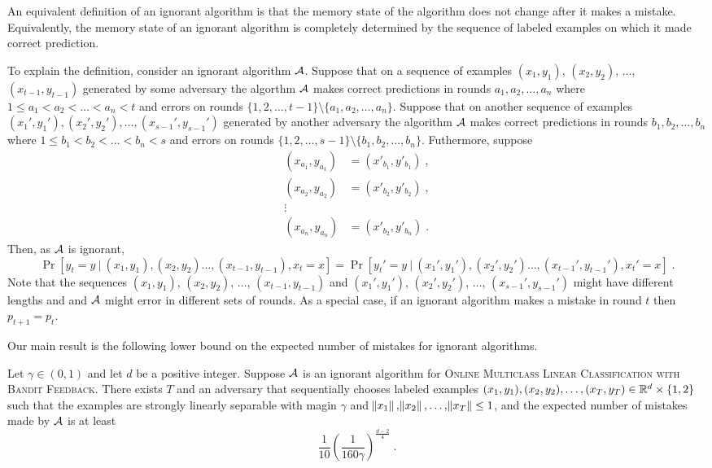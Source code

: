 An equivalent definition of an ignorant algorithm is that the memory state of
the algorithm does not change after it makes a mistake. Equivalently,
the memory state of an ignorant algorithm is completely determined
by the sequence of labeled examples on which it made correct prediction.

To explain the definition, consider an ignorant algorithm $\mathcal{A}$. Suppose that
on a sequence of examples $(x_1, y_1)$, $(x_2, y_2)$, $\dots$, $(x_{t-1}, y_{t-1})$
generated by some adversary the algorthm $\mathcal{A}$ makes correct predictions in
rounds $a_1, a_2, \dots, a_n$ where $1 \le a_1 < a_2 < \dots < a_n < t$ and
errors on rounds $\{1,2,\dots,t-1\} \setminus \{a_1, a_2, \dots, a_n\}$. Suppose
that on another sequence of examples $(x_1', y_1'), (x_2', y_2'), \dots,
(x_{s-1}', y_{s-1}')$ generated by another adversary the algorithm $\mathcal{A}$ makes
correct predictions in rounds $b_1, b_2, \dots, b_n$ where $1 \le b_1 < b_2 <
\dots < b_n < s$ and errors on rounds $\{1,2,\dots,s-1\} \setminus \{b_1, b_2,
\dots, b_n\}$. Futhermore, suppose
\begin{align*}
(x_{a_1}, y_{a_1}) &= (x'_{b_1}, y'_{b_1}) \; , \\
(x_{a_2}, y_{a_2}) &= (x'_{b_2}, y'_{b_2}) \; , \\
\vdots \\
(x_{a_n}, y_{a_n}) &= (x'_{b_2}, y'_{b_n}) \; .
\end{align*}
Then, as $\mathcal{A}$ is ignorant,
\[
\Pr[y_t = y ~|~ (x_1, y_1), (x_2, y_2) \dots, (x_{t-1}, y_{t-1}), x_t = x] =
\Pr[y_t' = y ~|~ (x_1', y_1'), (x_2', y_2') \dots, (x_{t-1}', y_{t-1}'), x_t' = x] \; .
\]
Note that the sequences $(x_1, y_1)$, $(x_2, y_2)$, $\dots$, $(x_{t-1},
y_{t-1})$ and $(x_1', y_1')$, $(x_2', y_2')$, $\dots$, $(x_{s-1}', y_{s-1}')$
might have different lengths and and $\mathcal{A}$ might error in different sets of
rounds. As a special case, if an ignorant algorithm makes a mistake in round $t$
then $p_{t+1}=p_t$.

Our main result is the following lower bound on the expected number of mistakes
for ignorant algorithms.

\begin{theorem}
\label{theorem:ignorant-lower-bound}
Let $\gamma \in (0,1)$ and let $d$ be a positive integer. Suppose $\mathcal{A}$ is an
ignorant algorithm for \textsc{Online Multiclass Linear Classification with
Bandit Feedback}. There exists $T$ and an adversary that sequentially chooses
labeled examples $(x_1, y_1), (x_2, y_2), \dots, (x_T, y_T) \in \mathbb{R}^d\times
\{1,2\}$ such that the examples are strongly linearly separable with magin
$\gamma$ and $\norm{x_1}, \norm{x_2}, \dots, \norm{x_T} \le 1$, and the expected
number of mistakes made by $\mathcal{A}$ is at least
$$
\frac{1}{10} \left(\frac{1}{160\gamma}\right)^{\frac{d-2}{4}} \; .
$$
\end{theorem}

